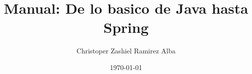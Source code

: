 \documentclass[12pt,a4paper]{report}
\begin{document}
	
	\title{\Huge \textbf{Manual: De lo basico de Java hasta Spring}}
	\author{Christoper Zashiel Ramirez Alba}
	\date{\today}
	\maketitle
	

	\dominitoc 
	\tableofcontents 
	\newpage
	
	
	
\end{document}
